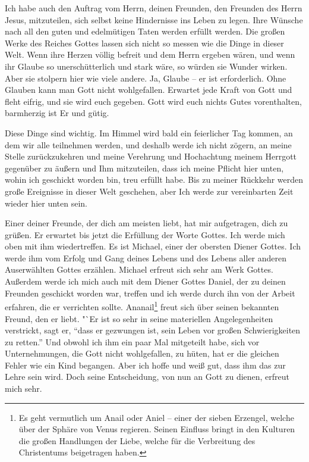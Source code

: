 Ich habe auch den Auftrag vom Herrn, deinen Freunden, den Freunden des Herrn Jesus, mitzuteilen, sich selbst keine Hindernisse ins Leben zu legen. Ihre Wünsche nach all den guten und edelmütigen Taten werden erfüllt werden. Die großen Werke des Reiches Gottes lassen sich nicht so messen wie die Dinge in dieser Welt. Wenn ihre Herzen völlig befreit und dem Herrn ergeben wären, und wenn ihr Glaube so unerschütterlich und stark wäre, so würden sie Wunder wirken. Aber sie stolpern hier wie viele andere. Ja, Glaube -- er ist erforderlich. Ohne Glauben kann man Gott nicht wohlgefallen. Erwartet jede Kraft von Gott und fleht eifrig, und sie wird euch gegeben. Gott wird euch nichts Gutes vorenthalten, barmherzig ist Er und gütig.

Diese Dinge sind wichtig. Im Himmel wird bald ein feierlicher Tag kommen, an dem wir alle teilnehmen werden, und deshalb werde ich nicht zögern, an meine Stelle zurückzukehren und meine Verehrung und Hochachtung meinem Herrgott gegenüber zu äußern und Ihm mitzuteilen, dass ich meine Pflicht hier unten, wohin ich geschickt worden bin, treu erfüllt habe. Bis zu meiner Rückkehr werden große Ereignisse in dieser Welt geschehen, aber Ich werde zur vereinbarten Zeit wieder hier unten sein. 

Einer deiner Freunde, der dich am meisten liebt, hat mir aufgetragen, dich zu grüßen. Er erwartet bis jetzt die Erfüllung der Worte Gottes. Ich werde mich oben mit ihm wiedertreffen. Es ist Michael, einer der obersten Diener Gottes. Ich werde ihm vom Erfolg und Gang deines Lebens und des Lebens aller anderen Auserwählten Gottes erzählen. Michael erfreut sich sehr am Werk Gottes. Außerdem werde ich mich auch mit dem Diener Gottes Daniel, der zu deinen Freunden geschickt worden war, treffen und ich werde durch ihn von der Arbeit erfahren, die er verrichten sollte. Ananail\footnote{Es geht vermutlich um Anail oder Aniel -- einer der sieben Erzengel, welche über der Sphäre von Venus regieren. Seinen Einfluss bringt in den Kulturen die großen Handlungen der Liebe, welche für die Verbreitung des Christentums beigetragen haben. } freut sich über seinen bekannten Freund, den er liebt. "`Er ist so sehr in seine materiellen Angelegenheiten verstrickt, sagt er, "`dass er gezwungen ist, sein Leben vor großen Schwierigkeiten zu retten."' Und obwohl ich ihm ein paar Mal mitgeteilt habe, sich vor Unternehmungen, die Gott nicht wohlgefallen, zu hüten, hat er die gleichen Fehler wie ein Kind begangen. Aber ich hoffe und weiß gut, dass ihm das zur Lehre sein wird. Doch seine Entscheidung, von nun an Gott zu dienen, erfreut mich sehr.

